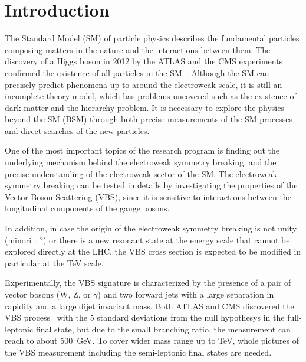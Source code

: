 \chapter{Introduction}
\label{chap:introduction}


The Standard Model (SM) of particle physics describes the fundamental particles composing matters in the nature and the interactions between them. 
The discovery of a Higgs boson in 2012 by the ATLAS and the CMS experiments confirmed the existence of all particles in the SM~\cite{HIGG-2012-27,CMS-HIG-12-028}. 
Although the SM can precisely predict phenomena up to around the electroweak scale, it is still an incomplete theory model, which has problems uncovered such as the existence of dark matter and the hierarchy problem. 
It is necessary to explore the physics beyond the SM (BSM) through both precise measurements of the SM processes and direct searches of the new particles.

One of the most important topics of the research program is finding out the underlying mechanism behind the electroweak symmetry breaking, and the precise understanding of the electroweak sector of the SM. 
The electroweak symmetry breaking can be tested in details by investigating the properties of the Vector Boson Scattering (VBS), since it is sensitive to interactions between the longitudinal components of the gauge bosons.

%
In addition, in case the origin of the electroweak symmetry breaking is not unity (minori : ?) or there is a new resonant state at the energy scale that cannot be explored directly at the LHC, the VBS cross section is expected to be modified in particular at the TeV scale.

Experimentally, the VBS signature is characterized by the presence of a pair of vector bosons (W, Z, or $\gamma$) and two forward jets with a large separation in rapidity and a large dijet invariant mass.
Both ATLAS and CMS discovered the VBS process~\cite{STDM-2017-19,CMS-SMP-20-001}
with the 5 standard deviations from the null hypothesys in the full-leptonic final state, but due to the small branching ratio, the measurement can reach to about 500~GeV.
To cover wider mass range up to TeV, whole pictures of the VBS measurement including the semi-leptonic final states are needed.

